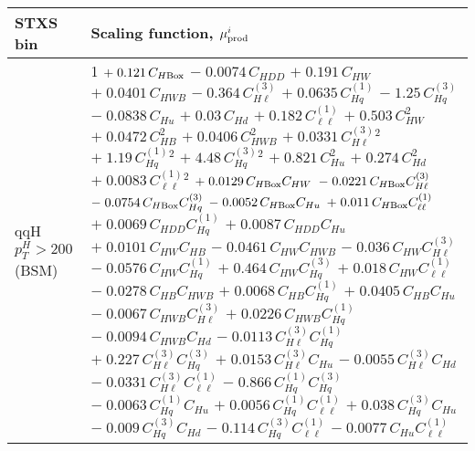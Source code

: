 \begin{tabular}{l|p{}}
    STXS bin & Scaling function, $\mu^i_{\rm{prod}}$ \\ \hline
    qqH $p_{T}^{H} > 200$ (BSM) & 1 $+\;0.121\,C_{H\rm{Box}}$ $-\;0.0074\,C_{HDD}$ $+\;0.191\,C_{HW}$ $+\;0.0401\,C_{HWB}$ $-\;0.364\,C^{(3)}_{H\ell}$ $+\;0.0635\,C^{(1)}_{Hq}$ $-\;1.25\,C^{(3)}_{Hq}$ $-\;0.0838\,C_{Hu}$ $+\;0.03\,C_{Hd}$ $+\;0.182\,C^{(1)}_{\ell\ell}$ $+\;0.503\,C_{HW}^{2}$ $+\;0.0472\,C_{HB}^{2}$ $+\;0.0406\,C_{HWB}^{2}$ $+\;0.0331\,C^{(3)}_{H\ell}^{2}$ $+\;1.19\,C^{(1)}_{Hq}^{2}$ $+\;4.48\,C^{(3)}_{Hq}^{2}$ $+\;0.821\,C_{Hu}^{2}$ $+\;0.274\,C_{Hd}^{2}$ $+\;0.0083\,C^{(1)}_{\ell\ell}^{2}$ $+\;0.0129\,C_{H\rm{Box}}C_{HW}$ $-\;0.0221\,C_{H\rm{Box}}C^{(3)}_{H\ell}$ $-\;0.0754\,C_{H\rm{Box}}C^{(3)}_{Hq}$ $-\;0.0052\,C_{H\rm{Box}}C_{Hu}$ $+\;0.011\,C_{H\rm{Box}}C^{(1)}_{\ell\ell}$ $+\;0.0069\,C_{HDD}C^{(1)}_{Hq}$ $+\;0.0087\,C_{HDD}C_{Hu}$ $+\;0.0101\,C_{HW}C_{HB}$ $-\;0.0461\,C_{HW}C_{HWB}$ $-\;0.036\,C_{HW}C^{(3)}_{H\ell}$ $-\;0.0576\,C_{HW}C^{(1)}_{Hq}$ $+\;0.464\,C_{HW}C^{(3)}_{Hq}$ $+\;0.018\,C_{HW}C^{(1)}_{\ell\ell}$ $-\;0.0278\,C_{HB}C_{HWB}$ $+\;0.0068\,C_{HB}C^{(1)}_{Hq}$ $+\;0.0405\,C_{HB}C_{Hu}$ $-\;0.0067\,C_{HWB}C^{(3)}_{H\ell}$ $+\;0.0226\,C_{HWB}C^{(1)}_{Hq}$ $-\;0.0094\,C_{HWB}C_{Hd}$ $-\;0.0113\,C^{(3)}_{H\ell}C^{(1)}_{Hq}$ $+\;0.227\,C^{(3)}_{H\ell}C^{(3)}_{Hq}$ $+\;0.0153\,C^{(3)}_{H\ell}C_{Hu}$ $-\;0.0055\,C^{(3)}_{H\ell}C_{Hd}$ $-\;0.0331\,C^{(3)}_{H\ell}C^{(1)}_{\ell\ell}$ $-\;0.866\,C^{(1)}_{Hq}C^{(3)}_{Hq}$ $-\;0.0063\,C^{(1)}_{Hq}C_{Hu}$ $+\;0.0056\,C^{(1)}_{Hq}C^{(1)}_{\ell\ell}$ $+\;0.038\,C^{(3)}_{Hq}C_{Hu}$ $-\;0.009\,C^{(3)}_{Hq}C_{Hd}$ $-\;0.114\,C^{(3)}_{Hq}C^{(1)}_{\ell\ell}$ $-\;0.0077\,C_{Hu}C^{(1)}_{\ell\ell}$ \\

\end{tabular}
